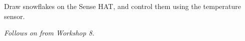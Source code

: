 %
%
%

\newif\ifprint
\printfalse



\newcommand{\workshopTitle}{Workshop 8 Extension: Snowflakes}

\newcommand{\workshopAuthor}{Jack Kelly}



	
	
	Draw snowflakes on the Sense HAT, and control them using the temperature sensor.
	
	\textit{Follows on from Workshop 8.}
	
	\tableofcontents
	\vspace{12pt}
	
	
	
	\clearpage
	
	\pagebreak[3]
	
	\pagebreak[3]
	
	
